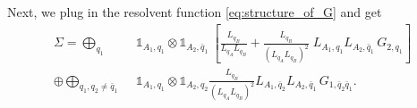 \documentclass[aps,pra,reprint,superscriptaddress,twocolumn,notitlepage]{revtex4-1}
\numberwithin{equation}{section}
\begin{document}
\begin{widetext}
Next, we plug in the resolvent function \eqref{eq:structure_of_G} and get
\begin{equation}
\begin{aligned}
    \Sigma = \bigoplus_{q_1}\ \ \, &  \ \ \mathbb{1}_{A_1,q_1} \otimes \mathbb{1}_{A_2,\bar{q}_1}  \ \left[ \frac{L_{q_B}}{L_{q_A} L_{q_B}} 
     +\frac{L_{q_B}}{(L_{q_A} L_{q_B})^2} \; L_{A_1,q_1} L_{A_2,\bar{q}_1} \, G_{2,q_1} \right]\\
     \oplus  \bigoplus_{q_1,q_2\neq \bar{q}_1} &  \ \ \mathbb{1}_{A_1,q_1} \otimes \mathbb{1}_{A_2,q_2} \frac{L_{q_B}}{(L_{q_A} L_{q_B})^2} L_{A_1,\bar{q}_2} L_{A_2,\bar{q}_1} \, G_{1,\bar{q}_2\bar{q}_1} .
\end{aligned}    
\end{equation}



\end{widetext}
\end{document}

